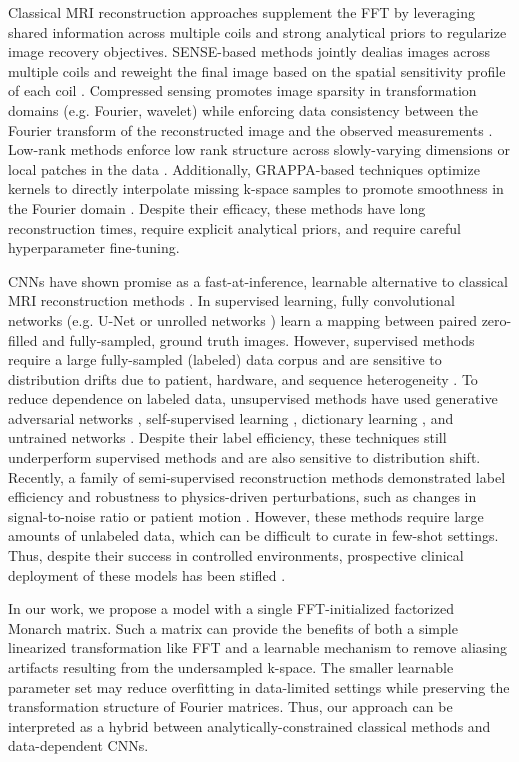 Classical MRI reconstruction approaches supplement the FFT by leveraging shared information across multiple coils and strong analytical priors to regularize image recovery objectives. SENSE-based methods jointly dealias images across multiple coils and reweight the final image based on the spatial sensitivity profile of each coil \citep{pruessmann1999sense}. Compressed sensing promotes image sparsity in transformation domains (e.g. Fourier, wavelet) while enforcing data consistency between the Fourier transform of the reconstructed image and the observed measurements \citep{lustig2007sparse}. Low-rank methods enforce low rank structure across slowly-varying dimensions or local patches in the data \citep{ong2016beyond,ravishankar2017low,haldar2013low}. Additionally, GRAPPA-based techniques optimize kernels to directly interpolate missing k-space samples to promote smoothness in the Fourier domain \cite{griswold2002generalized}. Despite their efficacy, these methods have long reconstruction times, require explicit analytical priors, and require careful hyperparameter fine-tuning.

CNNs have shown promise as a fast-at-inference, learnable alternative to classical MRI reconstruction methods \cite{knoll2020deep}. In supervised learning, fully convolutional networks (e.g. U-Net \citep{ronneberger2015u} or unrolled networks \citep{sandino2020compressed,hammernik2018learning}) learn a mapping between paired zero-filled and fully-sampled, ground truth images. However, supervised methods require a large fully-sampled (labeled) data corpus and are sensitive to distribution drifts due to patient, hardware, and sequence heterogeneity \cite{darestani2021measuring}. To reduce dependence on labeled data, unsupervised methods have used generative adversarial networks \citep{cole2020unsupervised, mardani2018deep}, self-supervised learning \cite{yaman2020self}, dictionary learning \cite{lahiri2021blind}, and untrained networks \cite{darestani2021accelerated}. Despite their 
label efficiency, these techniques still underperform supervised methods and are also sensitive to distribution shift. Recently, a family of semi-supervised reconstruction methods demonstrated label efficiency and robustness to physics-driven perturbations, such as changes in signal-to-noise ratio or patient motion \citep{desai2021noise2recon, desai2021vortex}. However, these methods require large amounts of unlabeled data, which can be difficult to curate in few-shot settings. Thus, despite their success in controlled environments, prospective clinical deployment of these models has been stifled \citep{chaudhari2020prospective}.

In our work, we propose a model with a single FFT-initialized factorized Monarch matrix. Such a matrix can provide the benefits of both a simple linearized transformation like FFT and a learnable mechanism to remove aliasing artifacts resulting from the undersampled k-space. The smaller learnable parameter set may reduce overfitting in data-limited settings while preserving the transformation structure of Fourier matrices. Thus, our approach can be interpreted as a hybrid between analytically-constrained classical methods and data-dependent CNNs.


